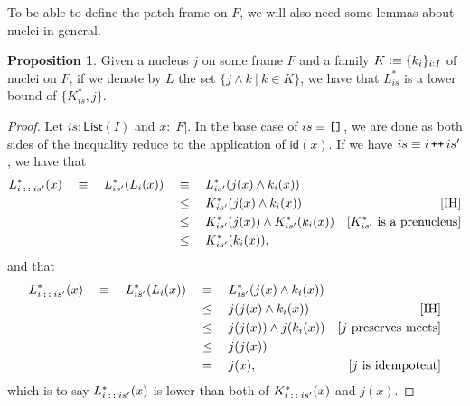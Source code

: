 \documentclass[a4paper, 11pt]{article}
\theoremstyle{definition}
\newtheorem{prop}{Proposition}
\newcommand{\is}{\vcentcolon\equiv}
\DeclareMathOperator{\emptyl}{\text{\texttt{[]}}}
\DeclareMathOperator{\cons}{\text{\texttt{::}}}
\DeclareMathOperator{\append}{\text{\texttt{++}}}
\begin{document}
To be able to define the patch frame on $F$, we will also need some lemmas about nuclei in general.

\begin{prop}
  Given a nucleus $j$ on some frame $F$ and a family $K \is \{ k_i \}_{i : I}$ of nuclei on $F$, if
  we denote by $L$ the set $\{ j \wedge k ~|~ k \in K \}$, we have that $L^*_{is}$ is a lower bound of
  $\{ K^*_{is}, j \}$.
\end{prop}
\begin{proof}
  Let $is : \mathsf{List}(I)$ and $x : | F |$. In the base case of $is \equiv \emptyl$, we are done
  as both sides of the inequality reduce to the application of $\mathsf{id}(x)$. If we have
  $is \equiv i \append is'$, we have that
  \begin{align*}
    L^*_{i \cons is'}(x)
      \quad\equiv\quad L^*_{is'}(L_i(x))
     &\quad\equiv\quad L^*_{is'}(j(x) \wedge k_i(x)) \\
     &\quad\le\quad K^*_{is'}(j(x) \wedge k_i(x)) & [\text{IH}] \\
     &\quad\le\quad K^*_{is'}(j(x)) \wedge K^*_{is'}(k_i(x)) & [K^*_{is'}\ \text{is a prenucleus}] \\
     &\quad\le\quad K^*_{is'}(k_i(x)),
  \end{align*}
  and that
  \begin{align*}
    L^*_{i \cons is'}(x)
    \quad\equiv\quad L^*_{is'}(L_i(x)) 
    &\quad\equiv\quad L^*_{is'}(j(x) \wedge k_i(x)) & \\
    &\quad\le\quad j(j(x) \wedge k_i(x)) & [\text{IH}] \\
    &\quad\le\quad j(j(x)) \wedge j(k_i(x)) & [\text{$j$ preserves meets}]\\
    &\quad\le\quad j(j(x)) & \\
    &\quad=\quad j(x), & [\text{$j$ is idempotent}]
  \end{align*}
  which is to say $L^*_{i \cons is'}(x)$ is lower than both of $K^*_{i \cons is'}(x)$ and $j(x)$.
\end{proof}
\end{document}
